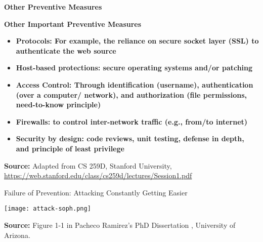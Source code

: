 \documentclass[aspectratio=169]{beamer} %
\begin{document}
\begin{frame}{\textbf{Other Preventive Measures}}
	
	\vspace{\baselineskip}
	
	\begin{block}{\textbf{Other Important Preventive Measures}}
		\begin{itemize}
			\item \textbf{\textcolor{miamired}{Protocols:} For example, the reliance on secure socket layer (SSL) to authenticate the web source}
			
			\item \textbf{\textcolor{miamired}{Host-based protections:} secure operating systems and/or patching}
			
			\item \textbf{\textcolor{miamired}{Access Control:} Through identification (username), authentication (over a computer/ network), and authorization (file permissions, need-to-know principle)}
			
			\item \textbf{\textcolor{miamired}{Firewalls:} to control inter-network traffic (e.g., from/to internet)}
			
			\item \textbf{\textcolor{miamired}{Security by design:} code reviews, unit testing, defense in depth, and principle of least privilege}
		\end{itemize}
	\end{block}

	\EndofPage

	\centering \scriptsize{\textbf{Source:} Adapted from CS 259D, Stanford University, \url{https://web.stanford.edu/class/cs259d/lectures/Session1.pdf}}
	
	\vspace{0.5\baselineskip}
\end{frame}

\begin{frame}{Failure of Prevention: Attacking Constantly Getting Easier}
	\centering 
	
	\vspace{0.25\baselineskip}
	
	\texttt{[image: attack-soph.png]}
	
	\EndofPage
	
	\centering \scriptsize{\textbf{Source:} Figure 1-1 in  Pacheco Ramirez's PhD Dissertation \cite{pacheco2017anomaly}, University of Arizona.}
	
	\vspace{0.5\baselineskip}
\end{frame}
\end{document}
